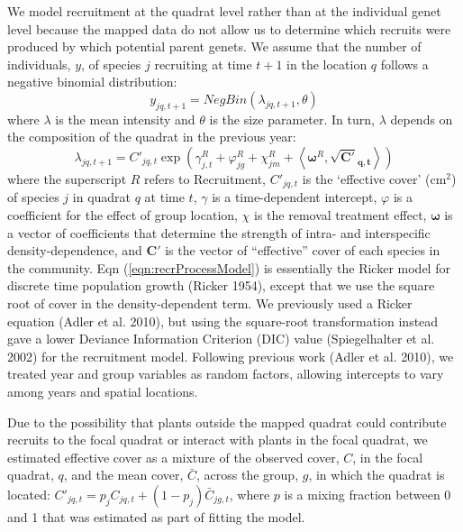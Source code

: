 \documentclass[11pt]{article}
\begin{document}
\begin{doublespacing}
We model recruitment at the quadrat level rather than at the individual genet level because the mapped data do not allow us to determine which recruits were produced by which potential parent genets. We assume that the number of individuals, $y$, of species $j$ recruiting at time $t+1$ in the location $q$ follows a negative binomial distribution:
\begin{equation}
y_{jq,t+1}= NegBin(\lambda_{jq,t+1},\theta) 	   
\label{eqn:recrDataModel}
\end{equation}
where $\lambda$ is the mean intensity and $\theta$ is the size parameter. In turn, $\lambda$ depends on the composition of the quadrat in the previous year:
\begin{equation}
\lambda_{jq,t+1} = C'_{jq,t} \exp{\left(\gamma_{j,t}^R +  \varphi_{jg}^R + \chi_{jm}^R + 
\left \langle \boldsymbol{\omega}^R , \boldsymbol{\sqrt{C'}_{q,t}} \right \rangle \right) }
\label{eqn:recrProcessModel}
\end{equation}
where the superscript $R$ refers to Recruitment, $C'_{jq,t}$ is the `effective cover' (cm$^2$) of species $j$ in quadrat $q$ at time $t$, $\gamma$ is a time-dependent intercept, $\varphi$ is a coefficient for the effect of group location,
$\chi$ is the removal treatment effect, $\boldsymbol{\omega}$ is a vector of coefficients that determine the strength of intra- and interspecific density-dependence, and $\boldsymbol{C'}$ is the vector of ``effective'' cover of each species in the community. Eqn (\ref{eqn:recrProcessModel}) is essentially the Ricker model for discrete time population growth (Ricker 1954), except that we use the square root of cover in the density-dependent term. We previously used a Ricker equation (Adler et al. 2010), but using the square-root transformation instead gave a lower Deviance Information Criterion (DIC) value (Spiegelhalter et al. 2002) for the recruitment model. Following previous work (Adler et al. 2010), we treated year and group variables as random factors, allowing intercepts to vary among years and spatial locations. 

Due to the possibility that plants outside the mapped quadrat could contribute recruits to the focal quadrat or interact with plants in the focal quadrat, we estimated effective cover as a mixture of the observed cover, $C$, in the focal quadrat, $q$, and the mean cover, $\bar{C}$, across the group, $g$, in 
which the quadrat is located: $C'_{jq,t}=p_j C_{jq,t}+(1-p_j) \bar{C}_{jg,t}$, where $p$ is a mixing fraction between 0 and 1 that was estimated as part of fitting the model.


\end{doublespacing}
\end{document}
